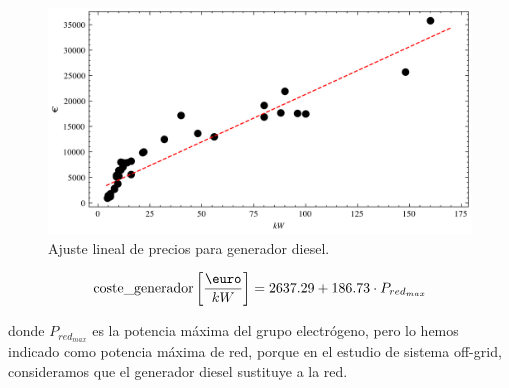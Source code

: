 \begin{figure}[h] \centering
	\centering
	\includegraphics[width=1\textwidth]{./capitulos/adquisicion_de_datos/images/generator_regression.png}
	\caption{Ajuste lineal de precios para generador diesel.}
	\label{fig:generator_regression}
\end{figure}


\begin{equation}
	\text{coste\_generador} \left[\frac{\text{\euro}}{kW}\right] = 2637.29 + 186.73 \cdot P_{red_{max}}
\end{equation}

donde $P_{red_{max}}$ es la potencia máxima del grupo electrógeno, pero lo
hemos indicado como potencia máxima de red, porque en el estudio de sistema
off-grid, consideramos que el generador diesel sustituye a la red.
